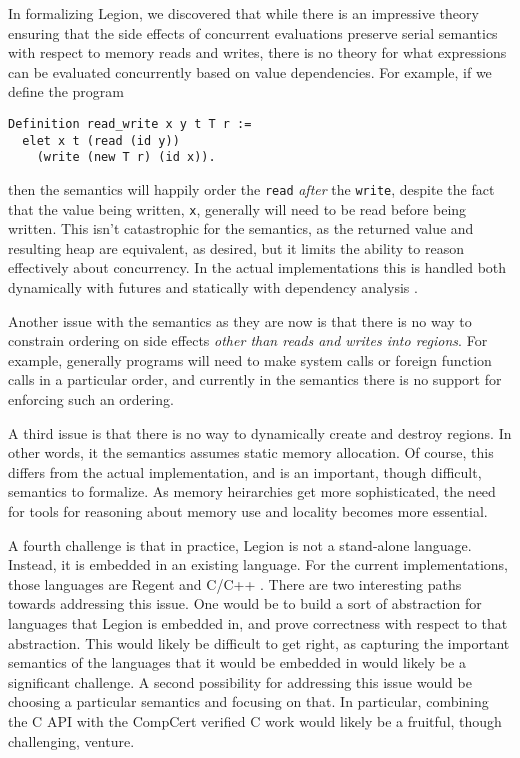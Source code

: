 \documentclass[sigconf]{acmart}
\begin{document}
In formalizing Legion, we discovered that while there is an impressive theory
ensuring that the side effects of concurrent evaluations preserve serial
semantics with respect to memory reads and writes, there is no theory for what
expressions can be evaluated concurrently based on value dependencies. For
example, if we define the program
\begin{center}
\begin{BVerbatim}
Definition read_write x y t T r :=
  elet x t (read (id y)) 
    (write (new T r) (id x)).
\end{BVerbatim}
\end{center}
then the semantics will happily order the \texttt{read} \emph{after} the
\texttt{write}, despite the fact that the value being written, \texttt{x},
generally will need to be read before being written. This isn't catastrophic
for the semantics, as the returned value and resulting heap are equivalent, 
as desired, but it limits the ability to reason effectively about concurrency. 
In the actual implementations this is handled both dynamically with futures
and statically with dependency analysis \cite{regent}.

Another issue with the semantics as they are now is that there is no way to 
constrain ordering on side effects \emph{other than reads and writes into
regions}. For example, generally programs will need to make system calls or
foreign function calls in a particular order, and currently in the semantics
there is no support for enforcing such an ordering.

A third issue is that there is no way to dynamically create and destroy
regions. In other words, it the semantics assumes static memory allocation.
Of course, this differs from the actual implementation, and is an important,
though difficult, semantics to formalize. As memory heirarchies get more 
sophisticated, the need for tools for reasoning about memory use and locality
becomes more essential. 

A fourth challenge is that in practice, Legion is not a stand-alone language.
Instead, it is embedded in an existing language. For the current implementations, 
those languages are Regent and C/C++ \cite{regent, legion}. There are two 
interesting paths towards addressing this issue. One would be to build a sort 
of abstraction for languages that Legion is embedded in, and prove correctness
with respect to that abstraction. This would likely be difficult to get right, as 
capturing the important semantics of the languages that it would be embedded in
would likely be a significant challenge. A second possibility for addressing this 
issue would be choosing a particular semantics and focusing on that. In particular,
combining the C API with the CompCert verified C work would likely be a
fruitful, though challenging, venture. 
\end{document}
